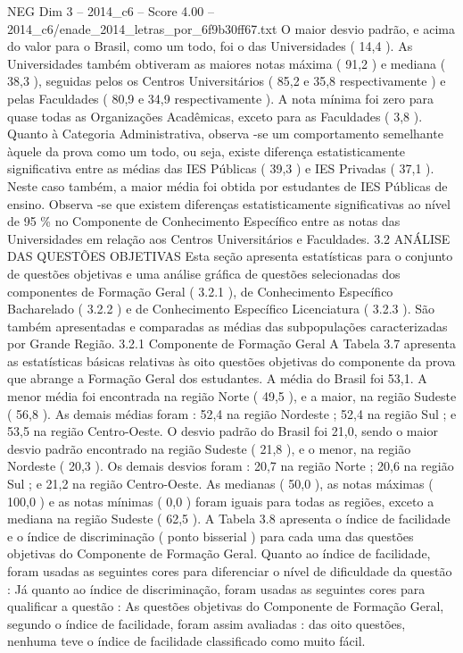 \begin{textsample}{NEG Dim 3 – 2014\_c6 – Score 4.00 – 2014\_c6/enade\_2014\_letras\_por\_6f9b30ff67.txt}
O maior desvio padrão, e acima do valor para o Brasil, como um todo, foi o das Universidades ( 14,4 ).
As Universidades também obtiveram as maiores notas máxima ( 91,2 ) e mediana ( 38,3 ), seguidas pelos os Centros Universitários ( 85,2 e 35,8 respectivamente ) e pelas Faculdades ( 80,9 e 34,9 respectivamente ).
A nota mínima foi zero para quase todas as Organizações Acadêmicas, exceto para as Faculdades ( 3,8 ).
Quanto à Categoria Administrativa, observa -se um comportamento semelhante àquele da prova como um todo, ou seja, existe diferença estatisticamente significativa entre as médias das IES Públicas ( 39,3 ) e IES Privadas ( 37,1 ).
Neste caso também, a maior média foi obtida por estudantes de IES Públicas de ensino.
Observa -se que existem diferenças estatisticamente significativas ao nível de 95 \% no Componente de Conhecimento Específico entre as notas das Universidades em relação aos Centros Universitários e Faculdades. 3.2 ANÁLISE DAS QUESTÕES OBJETIVAS Esta seção apresenta estatísticas para o conjunto de questões objetivas e uma análise gráfica de questões selecionadas dos componentes de Formação Geral ( 3.2.1 ), de Conhecimento Específico Bacharelado ( 3.2.2 ) e de Conhecimento Específico Licenciatura ( 3.2.3 ).
São também apresentadas e comparadas as médias das subpopulações caracterizadas por Grande Região. 3.2.1 Componente de Formação Geral A Tabela 3.7 apresenta as estatísticas básicas relativas às oito questões objetivas do componente da prova que abrange a Formação Geral dos estudantes.
A média do Brasil foi 53,1.
A menor média foi encontrada na região Norte ( 49,5 ), e a maior, na região Sudeste ( 56,8 ).
As demais médias foram : 52,4 na região Nordeste ; 52,4 na região Sul ; e 53,5 na região Centro-Oeste.
O desvio padrão do Brasil foi 21,0, sendo o maior desvio padrão encontrado na região Sudeste ( 21,8 ), e o menor, na região Nordeste ( 20,3 ).
Os demais desvios foram : 20,7 na região Norte ; 20,6 na região Sul ; e 21,2 na região Centro-Oeste.
As medianas ( 50,0 ), as notas máximas ( 100,0 ) e as notas mínimas ( 0,0 ) foram iguais para todas as regiões, exceto a mediana na região Sudeste ( 62,5 ).
A Tabela 3.8 apresenta o índice de facilidade e o índice de discriminação ( ponto bisserial ) para cada uma das questões objetivas do Componente de Formação Geral.
Quanto ao índice de facilidade, foram usadas as seguintes cores para diferenciar o nível de dificuldade da questão : Já quanto ao índice de discriminação, foram usadas as seguintes cores para qualificar a questão : As questões objetivas do Componente de Formação Geral, segundo o índice de facilidade, foram assim avaliadas : das oito questões, nenhuma teve o índice de facilidade classificado como muito fácil.

\end{textsample}
